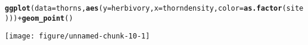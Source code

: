 \documentclass[12pt,a4paper]{scrartcl}\usepackage[]{graphicx}\usepackage[]{color}
\makeatletter
\def\maxwidth{ %
  \ifdim\Gin@nat@width>\linewidth
    \linewidth
  \else
    \Gin@nat@width
  \fi
}
\newcommand{\hlopt}[1]{\textcolor[rgb]{0,0,0}{#1}}%
\newcommand{\hlstd}[1]{\textcolor[rgb]{0.345,0.345,0.345}{#1}}%
\newcommand{\hlkwc}[1]{\textcolor[rgb]{0.333,0.667,0.333}{#1}}%
\newcommand{\hlkwd}[1]{\textcolor[rgb]{0.737,0.353,0.396}{\textbf{#1}}}%
\newenvironment{kframe}{%
 \def\at@end@of@kframe{}%
 \ifinner\ifhmode%
  \def\at@end@of@kframe{\end{minipage}}%
  \begin{minipage}{\columnwidth}%
 \fi\fi%
 \def\FrameCommand##1{\hskip\@totalleftmargin \hskip-\fboxsep
 \colorbox{shadecolor}{##1}\hskip-\fboxsep
     \hskip-\linewidth \hskip-\@totalleftmargin \hskip\columnwidth}%
 \MakeFramed {\advance\hsize-\width
   \@totalleftmargin\z@ \linewidth\hsize
   \@setminipage}}%
 {\par\unskip\endMakeFramed%
 \at@end@of@kframe}
\newenvironment{knitrout}{}{} %
\makeatother
\begin{document}
\begin{Answer}
\begin{knitrout}
\begin{kframe}
{\ttfamily\noindent\itshape\color{messagecolor}{\#\# Registered S3 methods overwritten by 'ggplot2':\\\#\#\ \  method\ \ \ \ \ \ \ \  from \\\#\#\ \  [.quosures\ \ \ \  rlang\\\#\#\ \  c.quosures\ \ \ \  rlang\\\#\#\ \  print.quosures rlang}}\begin{alltt}
\hlkwd{ggplot}\hlstd{(}\hlkwc{data}\hlstd{=thorns,} \hlkwd{aes}\hlstd{(}\hlkwc{y}\hlstd{=herbivory,} \hlkwc{x}\hlstd{=thorndensity,} \hlkwc{color}\hlstd{=}\hlkwd{as.factor}\hlstd{(site)))} \hlopt{+} \hlkwd{geom_point}\hlstd{()}
\end{alltt}
\end{kframe}
\texttt{[image: figure/unnamed-chunk-10-1]} 

\end{knitrout}
\end{Answer}
\end{document}
